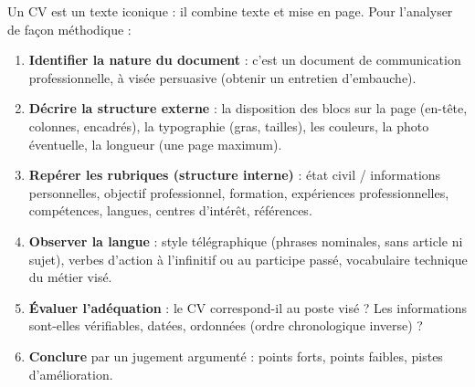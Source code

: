 \documentclass[11pt]{article}
\newcommand{\cle}[1]{{\popxbold\color{popdark}#1}}
\begin{document}
\begin{methode}
Un CV est un \cle{texte iconique} : il combine texte et mise en page. Pour l'analyser de façon méthodique :
\begin{enumerate}
\item \textbf{Identifier la nature du document} : c'est un document de communication professionnelle, à visée persuasive (obtenir un entretien d'embauche).
\item \textbf{Décrire la structure externe} : la disposition des blocs sur la page (en-tête, colonnes, encadrés), la typographie (gras, tailles), les couleurs, la photo éventuelle, la longueur (une page maximum).
\item \textbf{Repérer les rubriques (structure interne)} : état civil / informations personnelles, objectif professionnel, formation, expériences professionnelles, compétences, langues, centres d'intérêt, références.
\item \textbf{Observer la langue} : style télégraphique (phrases nominales, sans article ni sujet), verbes d'action à l'infinitif ou au participe passé, vocabulaire technique du métier visé.
\item \textbf{Évaluer l'adéquation} : le CV correspond-il au poste visé ? Les informations sont-elles vérifiables, datées, ordonnées (ordre chronologique inverse) ?
\item \textbf{Conclure} par un jugement argumenté : points forts, points faibles, pistes d'amélioration.
\end{enumerate}
\end{methode}
\end{document}
